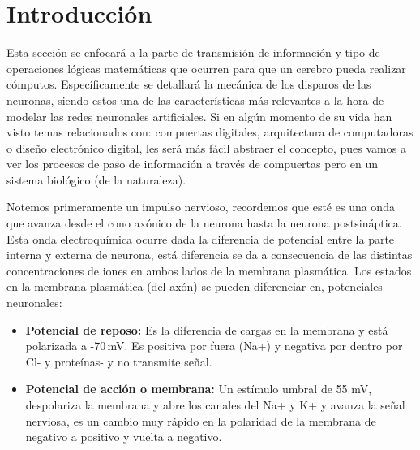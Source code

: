 
\section{Introducción}

Esta sección se enfocará a la parte de transmisión de información y tipo de operaciones lógicas matemáticas que ocurren para que un cerebro pueda realizar cómputos. Específicamente se detallará la mecánica de los disparos de las neuronas, siendo estos una de las características más relevantes a la hora de modelar las redes neuronales artificiales. Si en algún momento de su vida han visto temas relacionados con: compuertas digitales, arquitectura de computadoras o diseño electrónico digital, les será más fácil abstraer el concepto, pues vamos a ver los procesos de paso de información a través de compuertas pero en un sistema biológico (de la naturaleza). 

Notemos primeramente un impulso nervioso, recordemos que esté es una onda que avanza desde el cono axónico de la neurona hasta la neurona postsináptica. Esta onda electroquímica ocurre dada la diferencia de potencial entre la parte interna y externa de neurona, está diferencia se da a consecuencia de las distintas concentraciones de iones en ambos lados de la membrana plasmática. Los estados en la membrana plasmática (del axón) se pueden diferenciar en, potenciales neuronales:

\begin{itemize}
\item \textbf{Potencial de reposo:} Es la diferencia de cargas en la membrana y está polarizada a -70 mV. Es positiva por fuera (Na+) y negativa por dentro por Cl- y proteínas- y no transmite señal. 
\item \textbf{Potencial de acción o membrana:} Un estímulo umbral de 55 mV, despolariza la membrana y abre los canales del Na+ y K+ y avanza la señal nerviosa, es un cambio muy rápido en la polaridad de la membrana de negativo a positivo y vuelta a negativo.
\end{itemize}

